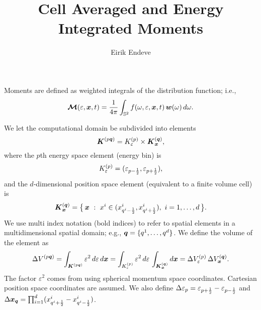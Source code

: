 \documentclass[10pt]{article}
\begin{document}
\title{Cell Averaged and Energy Integrated Moments}
\author{Eirik Endeve}

\maketitle

Moments are defined as weighted integrals of the distribution function; i.e.,
\begin{equation}
  \boldsymbol{\mathcal{M}}(\varepsilon,\boldsymbol{x},t) = \frac{1}{4\pi}\int_{\mathbb{S}^{2}}f(\omega,\varepsilon,\boldsymbol{x},t)\,\boldsymbol{w}(\omega)\,d\omega.  
\end{equation}

We let the computational domain be subdivided into elements
\begin{equation}
  \boldsymbol{K}^{(p\boldsymbol{q})} = K_{\varepsilon}^{(p)} \times \boldsymbol{K}_{\boldsymbol{x}}^{(\boldsymbol{q})},
\end{equation}
where the $p$th energy space element (energy bin) is
\begin{equation}
  K_{\varepsilon}^{(p)} = (\varepsilon_{p-\frac{1}{2}},\varepsilon_{p+\frac{1}{2}}),
\end{equation}
and the $d$-dimensional position space element (equivalent to a finite volume cell) is
\begin{equation}
  \boldsymbol{K}_{\boldsymbol{x}}^{(\boldsymbol{q})} = \big\{\,\boldsymbol{x}~:~x^{i}\in(x_{q^{i}-\frac{1}{2}}^{i},x_{q^{i}+\frac{1}{2}}^{i}),~i=1,\ldots,d\,\big\}.  
\end{equation}
We use multi index notation (bold indices) to refer to spatial elements in a multidimensional spatial domain; e.g., $\boldsymbol{q}=\{q^{1},\ldots,q^{d}\}$.  
We define the volume of the element as
\begin{equation}
  \Delta V^{(p\boldsymbol{q})} 
  = \int_{\boldsymbol{K}^{(p\boldsymbol{q})}}\varepsilon^{2}\,d\varepsilon\,d\boldsymbol{x}
  = \int_{K_{\varepsilon}^{(p)}}\varepsilon^{2}\,d\varepsilon\,\int_{\boldsymbol{K}_{\boldsymbol{x}}^{(\boldsymbol{q})}}d\boldsymbol{x}
  = \Delta V_{\varepsilon}^{(p)}\,\Delta V_{\boldsymbol{x}}^{(\boldsymbol{q})}.
\end{equation}
The factor $\varepsilon^{2}$ comes from using spherical momentum space coordinates.  
Cartesian position space coordinates are assumed.  
We also define $\Delta\varepsilon_{p} = \varepsilon_{p+\frac{1}{2}}-\varepsilon_{p-\frac{1}{2}}$ and $\Delta \boldsymbol{x}_{\boldsymbol{q}}=\prod_{i=1}^{d}(x_{q^{i}+\frac{1}{2}}^{i}-x_{q^{i}-\frac{1}{2}}^{i})$.  
\end{document}
